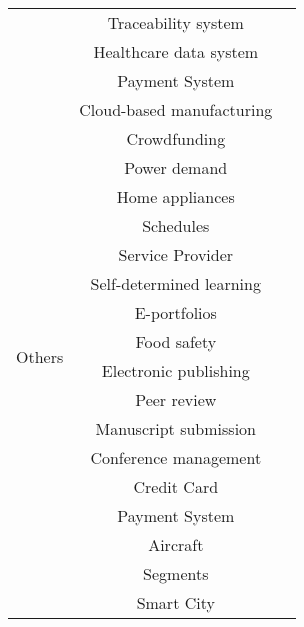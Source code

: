 \begin{longtable}{ |c|c|p{4cm}| }
	 & Traceability system & \cite{2016_Tian} \\ \cline{2-3}
	 & Healthcare data system & \cite{2016_Yue} \\ \cline{2-3}
	 & Payment System & \cite{2017_Jaag} \\
	 \hline
	 \multirow{18}{*}{Others} & Cloud-based manufacturing & \cite{2016_Bahga} \\ \cline{2-3}
	 & Crowdfunding & \cite{2016_Jacynycz} \\ \cline{2-3}
	 & Power demand & \multirow{3}{*}{\cite{2016_Kianmajd}} \\ \cline{2-2}
	 & Home appliances &  \\ \cline{2-2}
	 & Schedules &  \\ \cline{2-3}
	 & Service Provider & \cite{2016_Schaub} \\ \cline{2-3}
	 & Self-determined learning & \multirow{2}{*}{\cite{2016_Sharples}} \\ \cline{2-2}
	 & E-portfolios & \\ \cline{2-3}
	 & Food safety & \cite{2016_Tian} \\ \cline{2-3}
	 & Electronic publishing & \multirow{4}{*}{\cite{2017_Gipp}} \\ \cline{2-2}
	 & Peer review & \\ \cline{2-2}
	 & Manuscript   submission & \\ \cline{2-2}
	 & Conference management & \\ \cline{2-3}
	 & Credit Card & \multirow{2}{*}{\cite{2017_Jaag}} \\ \cline{2-2}
	 & Payment System & \\ \cline{2-3}
	 & Aircraft & \multirow{2}{*}{\cite{2017_Madhwal}} \\ \cline{2-2}
	 & Segments &  \\ \cline{2-3}
	 & Smart City & \cite{2018_Alessandra} \\
	 \hline
\end{longtable}


